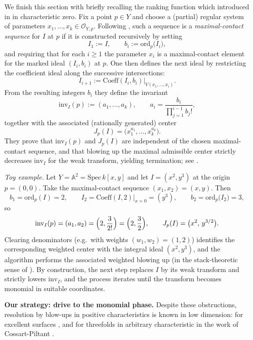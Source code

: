 \documentclass[11pt]{amsart}
\begin{document}
We finish this section with briefly recalling the ranking function which introduced in \cite{AbramovichTemkinWlodarczyk2024} in characteristic zero. 
Fix a point $p\in Y$ and choose a (partial) regular system of parameters
$x_1,\dots,x_k\in\mathcal{O}_{Y,p}$.
Following \cite{AbramovichTemkinWlodarczyk2024}, such a sequence is a \emph{maximal-contact sequence}
for $I$ at $p$ if it is constructed recursively by setting
\[
I_1:=I,\qquad b_i:=\mathrm{ord}_p\bigl(I_i\bigr),
\]
and requiring that for each $i\ge 1$ the parameter $x_i$ is a maximal-contact element for the marked
ideal $(I_i,b_i)$ at $p$.  One then defines the next ideal by restricting the coefficient ideal along
the successive intersections:
\[
I_{i+1}:=\mathrm{Coeff}(I_i,b_i)\big|_{V(x_1,\dots,x_i)}.
\]
From the resulting integers $b_i$ they define the invariant
\[
\mathrm{inv}_I(p):=(a_1,\dots,a_k),\qquad
a_i=\frac{b_i}{\prod_{j=1}^{i-1} b_j!},
\]
together with the associated (rationally generated) center
\[
J_p(I)=\bigl(x_1^{a_1},\dots,x_k^{a_k}\bigr).
\]
They prove that $\mathrm{inv}_I(p)$ and $J_p(I)$ are independent of the chosen maximal-contact
sequence, and that blowing up the maximal admissible center strictly decreases $\mathrm{inv}_I$
for the weak transform, yielding termination; see \cite{AbramovichTemkinWlodarczyk2024}.

\medskip
\noindent\emph{Toy example.}
Let $Y=\mathbb{A}^2=\mathrm{Spec}\,k[x,y]$ and let $I=(x^2,y^3)$ at the origin $p=(0,0)$.
Take the maximal-contact sequence $(x_1,x_2)=(x,y)$. Then
\[
b_1=\mathrm{ord}_p(I)=2,\qquad
I_2=\mathrm{Coeff}(I,2)\big|_{x=0}=(y^3),\qquad
b_2=\mathrm{ord}_p\bigl(I_2\bigr)=3,
\]
so
\[
\mathrm{inv}_I(p)=(a_1,a_2)=\Bigl(2,\frac{3}{2!}\Bigr)=\Bigl(2,\frac{3}{2}\Bigr),
\qquad
J_p(I)=\bigl(x^{2},\,y^{3/2}\bigr).
\]
Clearing denominators (e.g.\ with weights $(w_1,w_2)=(1,2)$) identifies the corresponding weighted
center with the integral ideal $(x^2,y^3)$, and the algorithm performs the associated weighted
blowing up (in the stack-theoretic sense of \cite{AbramovichTemkinWlodarczyk2024}).  By construction,
the next step replaces $I$ by its weak transform and strictly lowers $\mathrm{inv}_I$, and the process
iterates until the transform becomes monomial in suitable coordinates.



\noindent \textbf{Our strategy: drive to the monomial phase.}
Despite these obstructions, resolution by blow-ups in positive characteristics is known in low dimension: for excellent surfaces
 \cite{Lipman1978,CJS2009}, and for threefolds in
arbitrary characteristic in the work of Cossart-Piltant \cite{CossartPiltant2008,CossartPiltant2009,CossartPiltant2014}.
\end{document}
